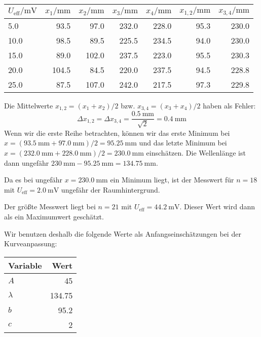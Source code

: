 		\begin{center}
			\begin{tabular}{l *{4}{r} | rr}
				\toprule
				$U_\text{eff} / \si{\milli\volt}$ & $x_1 / \si{\milli\meter}$ & $x_2 / \si{\milli\meter}$ & $x_3 / \si{\milli\meter}$ & $x_4 / \si{\milli\meter}$ & $x_{1,2} / \si{\milli\meter}$ & $x_{3,4} / \si{\milli\meter}$ \\
				\midrule
				\num{5.0} & \num{93.5} & \num{97.0} & \num{232.0} & \num{228.0}   & \num{95,3} & \num{230,0} \\
				\num{10.0} & \num{98.5} & \num{89.5} & \num{225.5} & \num{234.5}  & \num{94,0} & \num{230,0} \\
				\num{15.0} & \num{89.0} & \num{102.0} & \num{237.5} & \num{223.0} & \num{95,5} & \num{230,3} \\
				\num{20.0} & \num{104.5} & \num{84.5} & \num{220.0} & \num{237.5} & \num{94,5} & \num{228,8} \\
				\num{25.0} & \num{87.5} & \num{107.0} & \num{242.0} & \num{217.5} & \num{97,3} & \num{229,8} \\
				\bottomrule
			\end{tabular}
		\end{center}
		Die Mittelwerte $x_{1,2} = (x_1 + x_2)/2$ bzw. $x_{3,4} = (x_3 + x_4)/2$ haben als Fehler:
		\begin{equation}
			\Delta x_{1,2} = \Delta x_{3,4} = \frac{\SI{0.5}{\milli\meter}}{\sqrt{2}} = \SI{0,4}{\milli\meter}
		\end{equation}
		Wenn wir die erste Reihe betrachten, können wir das erste Minimum bei $x = (\SI{93,5}{\milli\meter} + \SI{97,0}{\milli\meter})/2 = \SI{95.25}{\milli\meter}$ und das letzte Minimum bei $x = (\SI{232.0}{\milli\meter} + \SI{228.0}{\milli\meter})/2 = \SI{230.0}{\milli\meter}$ einschätzen. Die Wellenlänge ist dann ungefähr $\SI{230}{\milli\meter} - \SI{95.25}{\milli\meter} = \SI{134.75}{\milli\meter}$. 

		Da es bei ungefähr $x = \SI{230.0}{\milli\meter}$ ein Minimum liegt, ist der Messwert für $n = 18$ mit $U_\text{eff} = \SI{2.0}{\milli\volt}$ ungefähr der Raumhintergrund. 

		Der größte Messwert liegt bei $n = 21$ mit $U_\text{eff} = \SI{44.2}{\milli\volt}$. Dieser Wert wird dann als ein Maximumwert geschätzt.

		Wir benutzen deshalb die folgende Werte als Anfangseinschätzungen bei der Kurveanpassung:
		\begin{center}
			\begin{tabular}{l r}
				\toprule
				Variable & Wert \\
				\midrule
				$A$ & \num{45} \\
				$\lambda$ & \num{134.75} \\
				$b$ & \num{95.2} \\
				$c$ & \num{2} \\
				\bottomrule
			\end{tabular}
		\end{center}

